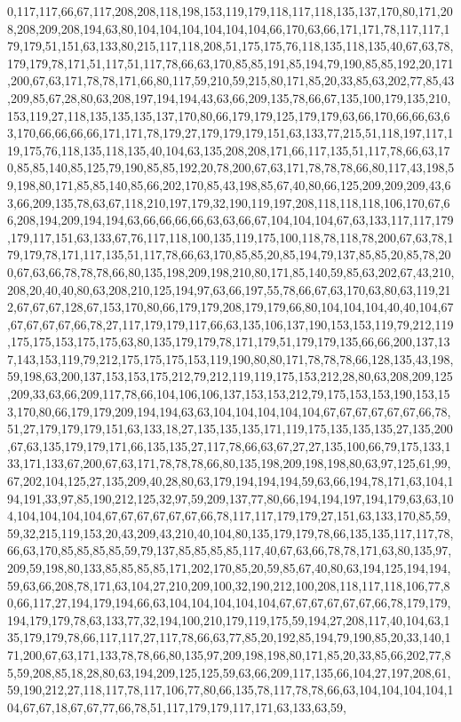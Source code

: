 0,117,117,66,67,117,208,208,118,198,153,119,179,118,117,118,135,137,170,80,171,208,208,209,208,194,63,80,104,104,104,104,104,104,66,170,63,66,171,171,78,117,117,179,179,51,151,63,133,80,215,117,118,208,51,175,175,76,118,135,118,135,40,67,63,78,179,179,78,171,51,117,51,117,78,66,63,170,85,85,191,85,194,79,190,85,85,192,20,171,200,67,63,171,78,78,171,66,80,117,59,210,59,215,80,171,85,20,33,85,63,202,77,85,43,209,85,67,28,80,63,208,197,194,194,43,63,66,209,135,78,66,67,135,100,179,135,210,153,119,27,118,135,135,135,137,170,80,66,179,179,125,179,179,63,66,170,66,66,63,63,170,66,66,66,66,171,171,78,179,27,179,179,179,151,63,133,77,215,51,118,197,117,119,175,76,118,135,118,135,40,104,63,135,208,208,171,66,117,135,51,117,78,66,63,170,85,85,140,85,125,79,190,85,85,192,20,78,200,67,63,171,78,78,78,66,80,117,43,198,59,198,80,171,85,85,140,85,66,202,170,85,43,198,85,67,40,80,66,125,209,209,209,43,63,66,209,135,78,63,67,118,210,197,179,32,190,119,197,208,118,118,118,106,170,67,66,208,194,209,194,194,63,66,66,66,66,63,63,66,67,104,104,104,67,63,133,117,117,179,179,117,151,63,133,67,76,117,118,100,135,119,175,100,118,78,118,78,200,67,63,78,179,179,78,171,117,135,51,117,78,66,63,170,85,85,20,85,194,79,137,85,85,20,85,78,200,67,63,66,78,78,78,66,80,135,198,209,198,210,80,171,85,140,59,85,63,202,67,43,210,208,20,40,40,80,63,208,210,125,194,97,63,66,197,55,78,66,67,63,170,63,80,63,119,212,67,67,67,128,67,153,170,80,66,179,179,208,179,179,66,80,104,104,104,40,40,104,67,67,67,67,67,66,78,27,117,179,179,117,66,63,135,106,137,190,153,153,119,79,212,119,175,175,153,175,175,63,80,135,179,179,78,171,179,51,179,179,135,66,66,200,137,137,143,153,119,79,212,175,175,175,153,119,190,80,80,171,78,78,78,66,128,135,43,198,59,198,63,200,137,153,153,175,212,79,212,119,119,175,153,212,28,80,63,208,209,125,209,33,63,66,209,117,78,66,104,106,106,137,153,153,212,79,175,153,153,190,153,153,170,80,66,179,179,209,194,194,63,63,104,104,104,104,104,67,67,67,67,67,67,66,78,51,27,179,179,179,151,63,133,18,27,135,135,135,171,119,175,135,135,135,27,135,200,67,63,135,179,179,171,66,135,135,27,117,78,66,63,67,27,27,135,100,66,79,175,133,133,171,133,67,200,67,63,171,78,78,78,66,80,135,198,209,198,198,80,63,97,125,61,99,67,202,104,125,27,135,209,40,28,80,63,179,194,194,194,59,63,66,194,78,171,63,104,194,191,33,97,85,190,212,125,32,97,59,209,137,77,80,66,194,194,197,194,179,63,63,104,104,104,104,104,67,67,67,67,67,67,66,78,117,117,179,179,27,151,63,133,170,85,59,59,32,215,119,153,20,43,209,43,210,40,104,80,135,179,179,78,66,135,135,117,117,78,66,63,170,85,85,85,85,59,79,137,85,85,85,85,117,40,67,63,66,78,78,171,63,80,135,97,209,59,198,80,133,85,85,85,85,171,202,170,85,20,59,85,67,40,80,63,194,125,194,194,59,63,66,208,78,171,63,104,27,210,209,100,32,190,212,100,208,118,117,118,106,77,80,66,117,27,194,179,194,66,63,104,104,104,104,104,67,67,67,67,67,67,66,78,179,179,194,179,179,78,63,133,77,32,194,100,210,179,119,175,59,194,27,208,117,40,104,63,135,179,179,78,66,117,117,27,117,78,66,63,77,85,20,192,85,194,79,190,85,20,33,140,171,200,67,63,171,133,78,78,66,80,135,97,209,198,198,80,171,85,20,33,85,66,202,77,85,59,208,85,18,28,80,63,194,209,125,125,59,63,66,209,117,135,66,104,27,197,208,61,59,190,212,27,118,117,78,117,106,77,80,66,135,78,117,78,78,66,63,104,104,104,104,104,67,67,18,67,67,77,66,78,51,117,179,179,117,171,63,133,63,59,